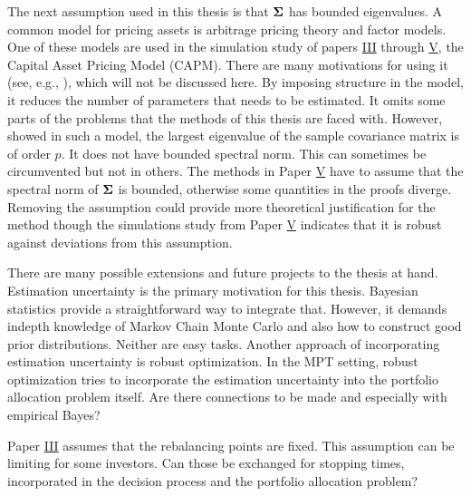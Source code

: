 \documentclass[12pt, twoside]{book}\usepackage{knitr}
\begin{document}
The next assumption used in this thesis is that $\mathbf{\Sigma}$ has bounded eigenvalues.
A common model for pricing assets is arbitrage pricing theory and factor models. 
One of these models are used in the simulation study of papers \hyperref[sec:paper3]{III} through \hyperref[sec:paper5]{V}, the Capital Asset Pricing Model (CAPM).
There are many motivations for using it (see, e.g., \citet{ross2013arbitrage}), which will not be discussed here.
By imposing structure in the model, it reduces the number of parameters that needs to be estimated.
It omits some parts of the problems that the methods of this thesis are faced with.
However, \citet{fan2013large} showed in such a model, the largest eigenvalue of the sample covariance matrix is of order $p$.
It does not have bounded spectral norm.
This can sometimes be circumvented but not in others.
The methods in Paper \hyperref[sec:paper5]{V} have to assume that the spectral norm of $\mathbf{\Sigma}$ is bounded, otherwise some quantities in the proofs diverge.
Removing the assumption could provide more theoretical justification for the method though the simulations study from Paper \hyperref[sec:paper5]{V} indicates that it is robust against deviations from this assumption.

There are many possible extensions and future projects to the thesis at hand.
Estimation uncertainty is the primary motivation for this thesis.
Bayesian statistics provide a straightforward way to integrate that. 
However, it demands indepth knowledge of Markov Chain Monte Carlo and also how to construct good prior distributions.
Neither are easy tasks.
Another approach of incorporating estimation uncertainty is robust optimization.
In the MPT setting, robust optimization tries to incorporate the estimation uncertainty into the portfolio allocation problem itself.
Are there connections to be made and especially with empirical Bayes?

Paper \hyperref[sec:paper3]{III} assumes that the rebalancing points are fixed.
This assumption can be limiting for some investors.
Can those be exchanged for stopping times, incorporated in the decision process and the portfolio allocation problem?
\end{document}
